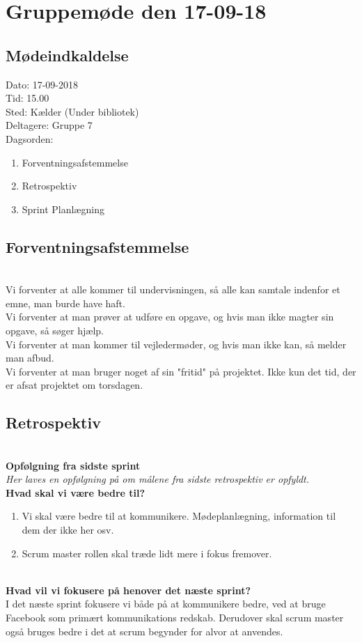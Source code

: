 \section{Gruppemøde den 17-09-18}

\subsection{Mødeindkaldelse}
Dato: 17-09-2018
\\Tid: 15.00
\\Sted: Kælder (Under bibliotek)
\\Deltagere: Gruppe 7
\\Dagsorden:
\begin{enumerate}
    \item Forventningsafstemmelse
    \item Retrospektiv
    \item Sprint Planlægning
\end{enumerate}
\subsection{Forventningsafstemmelse}
\\Vi forventer at alle kommer til undervisningen, så alle kan samtale indenfor et emne, man burde have haft. 
\\Vi forventer at man prøver at udføre en opgave, og hvis man ikke magter sin opgave, så søger hjælp.
\\Vi forventer at man kommer til vejledermøder, og hvis man ikke kan, så melder man afbud.
\\Vi forventer at man bruger noget af sin "fritid" på projektet. Ikke kun det tid, der er afsat projektet om torsdagen.
\subsection{Retrospektiv}
\\\textbf{Opfølgning fra sidste sprint}
\\\textit{Her laves en opfølgning på om målene fra sidste retrospektiv er opfyldt.}
\\\textbf{Hvad skal vi være bedre til?}
\begin{enumerate}
    \item Vi skal være bedre til at kommunikere. Mødeplanlægning, information til dem der ikke her osv.
    \item Scrum master rollen skal træde lidt mere i fokus fremover.
\end{enumerate}
\\\textbf{Hvad vil vi fokusere på henover det næste sprint?}
\\I det næste sprint fokusere vi både på at kommunikere bedre, ved at bruge Facebook som primært kommunikations redskab. Derudover skal scrum master også bruges bedre i det at scrum begynder for alvor at anvendes. 